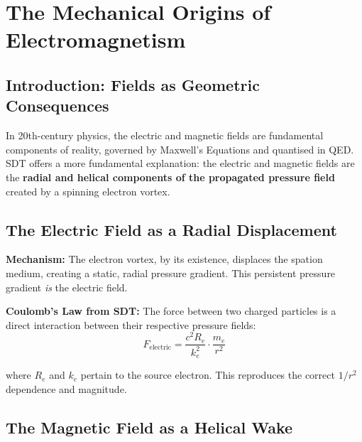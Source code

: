 \chapter{The Mechanical Origins of Electromagnetism}


\section{Introduction: Fields as Geometric Consequences}

In 20th-century physics, the electric and magnetic fields are fundamental components of reality, governed by Maxwell's Equations and quantised in QED.  SDT offers a more fundamental explanation: the electric and magnetic fields are the \textbf{radial and helical components of the propagated pressure field} created by a spinning electron vortex.


\section{The Electric Field as a Radial Displacement}

\textbf{Mechanism:} The electron vortex, by its existence, displaces the spation medium, creating a static, radial pressure gradient.  This persistent pressure gradient \emph{is} the electric field.

\textbf{Coulomb's Law from SDT:} The force between two charged particles is a direct interaction between their respective pressure fields:
\begin{equation}\label{eq:coulomb-sdt}
  F_{\text{electric}} = \frac{c^2 R_e}{k_e^2} \cdot \frac{m_e}{r^2}
\end{equation}

where $R_e$ and $k_e$ pertain to the source electron.  This reproduces the correct $1/r^2$ dependence and magnitude.


\section{The Magnetic Field as a Helical Wake}

